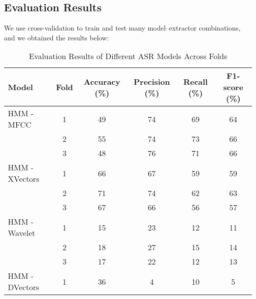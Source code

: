 \documentclass[conference]{IEEEtran}
\begin{document}
\subsection{Evaluation Results}
We use cross-validation to train and test many model–extractor combinations, and we obtained the results below:


\begin{table*}[htbp]
    \centering
    \caption{Evaluation Results of Different ASR Models Across Folds}
    \begin{tabular}{|l|c|c|c|c|c|}
        \hline
        \textbf{Model}       & \textbf{Fold} & \textbf{Accuracy (\%)} & \textbf{Precision (\%)} & \textbf{Recall (\%)} & \textbf{F1-score (\%)} \\
        \hline
        HMM - MFCC           & 1             & 49                     & 74                      & 69                   & 64                     \\
                             & 2             & 55                     & 74                      & 73                   & 66                     \\
                             & 3             & 48                     & 76                      & 71                   & 66                     \\
        HMM - XVectors       & 1             & 66                     & 67                      & 59                   & 59                     \\
                             & 2             & 71                     & 74                      & 62                   & 63                     \\
                             & 3             & 67                     & 66                      & 56                   & 57                     \\
        HMM - Wavelet        & 1             & 15                     & 23                      & 12                   & 11                     \\
                             & 2             & 18                     & 27                      & 15                   & 14                     \\
                             & 3             & 17                     & 22                      & 12                   & 13                     \\
        HMM - DVectors       & 1             & 36                     & 4                       & 10                   & 5                      \\

\end{tabular}
\end{table*}
\end{document}
